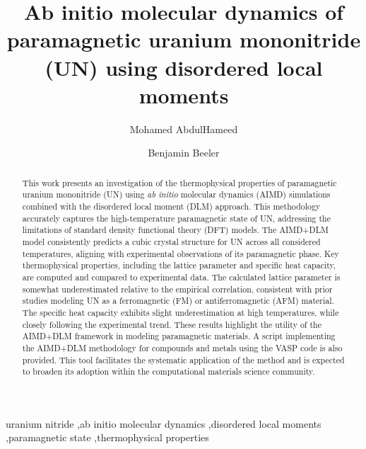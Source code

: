 \documentclass[preprint, 12pt]{elsarticle}
\newcommand{\?}{\stackrel{?}{=}}
\begin{document}
\begin{frontmatter}

\title{Ab initio molecular dynamics of paramagnetic uranium mononitride (UN) using disordered local moments}

\author[ncsu]{Mohamed AbdulHameed}
\author[ncsu,inl]{Benjamin Beeler}

\address[ncsu]{Department of Nuclear Engineering, North Carolina State University, Raleigh, NC 27695}
\address[inl]{Idaho National Laboratory, Idaho Falls, ID 83415}

\begin{abstract}

This work presents an investigation of the thermophysical properties of paramagnetic uranium mononitride (UN) using \textit{ab initio} molecular dynamics (AIMD) simulations combined with the disordered local moment (DLM) approach. This methodology accurately captures the high-temperature paramagnetic state of UN, addressing the limitations of standard density functional theory (DFT) models. The AIMD+DLM model consistently predicts a cubic crystal structure for UN across all considered temperatures, aligning with experimental observations of its paramagnetic phase. Key thermophysical properties, including the lattice parameter and specific heat capacity, are computed and compared to experimental data. The calculated lattice parameter is somewhat underestimated relative to the empirical correlation, consistent with prior studies modeling UN as a ferromagnetic (FM) or antiferromagnetic (AFM) material. The specific heat capacity exhibits slight underestimation at high temperatures, while closely following the experimental trend. These results highlight the utility of the AIMD+DLM framework in modeling paramagnetic materials. A script implementing the AIMD+DLM methodology for compounds and metals using the VASP code is also provided. This tool facilitates the systematic application of the method and is expected to broaden its adoption within the computational materials science community.

\end{abstract}

\begin{keyword}
uranium nitride \sep ab initio molecular dynamics \sep disordered local moments \sep paramagnetic state \sep thermophysical properties
\end{keyword}

\end{frontmatter}
\end{document}
